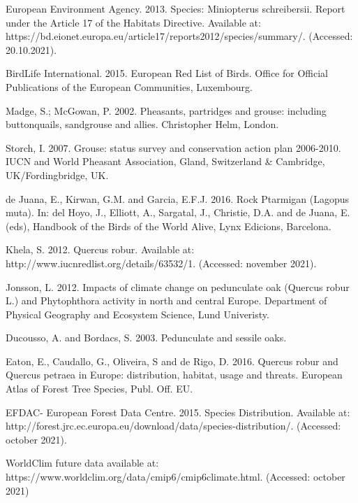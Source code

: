 \documentclass[12pt,a4paper]{article}
\begin{document}
\begin{thebibliography}{999}
European Environment Agency. 2013. Species: Miniopterus schreibersii. Report under the Article 17 of the Habitats Directive. Available at: https://bd.eionet.europa.eu/article17/reports2012/species/summary/. (Accessed: 20.10.2021).

BirdLife International. 2015. European Red List of Birds. Office for Official Publications of the European Communities, Luxembourg.

Madge, S.; McGowan, P. 2002. Pheasants, partridges and grouse: including buttonquails, sandgrouse and allies. Christopher Helm, London.

Storch, I. 2007. Grouse: status survey and conservation action plan 2006-2010. IUCN and World Pheasant Association, Gland, Switzerland \& Cambridge, UK/Fordingbridge, UK.

de Juana, E., Kirwan, G.M. and Garcia, E.F.J. 2016. Rock Ptarmigan (Lagopus muta). In: del Hoyo, J., Elliott, A., Sargatal, J., Christie, D.A. and de Juana, E. (eds), Handbook of the Birds of the World Alive, Lynx Edicions, Barcelona.

Khela, S. 2012. Quercus robur. Available at: http://www.iucnredlist.org/details/63532/1. (Accessed: november 2021).

Jonsson, L. 2012. Impacts of climate change on pedunculate oak (Quercus robur L.) and Phytophthora activity in north and central Europe. Department of Physical Geography and Ecosystem Science, Lund Univeristy.

Ducousso, A. and Bordacs, S. 2003. Pedunculate and sessile oaks.

Eaton, E., Caudallo, G., Oliveira, S and de Rigo, D. 2016. Quercus robur and Quercus petraea in Europe: distribution, habitat, usage and threats. European Atlas of Forest Tree Species, Publ. Off. EU.

EFDAC- European Forest Data Centre. 2015. Species Distribution. Available at: http://forest.jrc.ec.europa.eu/download/data/species-distribution/. (Accessed: october 2021).

WorldClim future data available at: https://www.worldclim.org/data/cmip6/cmip6climate.html. (Accessed: october 2021)


\end{thebibliography}
\end{document}
